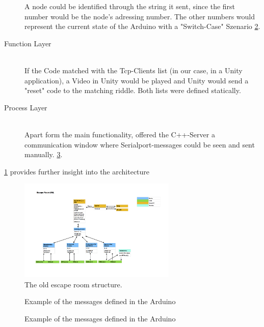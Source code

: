 \begin{description}
        A node could be identified through the string it sent, since the first number would be the node's adressing number. 
        The other numbers would represent the current state of the Arduino with a "Switch-Case" Szenario \ref{fig:switchCase}. 
	\item[Function Layer]\hfill \\
        If the Code matched with the Tcp-Clients list (in our case, in a Unity application), a Video in Unity would be played and Unity would send a "reset" code to the matching riddle. 
        Both lists were defined statically.
	\item[Process Layer]\hfill \\
	Apart form the main functionality, offered the C++-Server a communication window where Serialport-messages 
    could be seen and sent manually. \ref{fig:c++window}.

\end{description}
\ref{fig:oldEscapeUml} provides further insight into the architecture
\begin{figure}[th]
	\centering
	\includegraphics[width=75mm,scale=0.75]{Figures/oldEscapeUml}
	\decoRule
	\caption[UML]{The old escape room structure.}
	\label{fig:oldEscapeUml}
\end{figure}
\begin{figure}[th]
    \decoRule
    \caption[messages]{Example of the messages defined in the Arduino}
    \label{fig:switchCase}
\end{figure}
\begin{figure}[th]
    \decoRule
    \caption[messages]{Example of the messages defined in the Arduino}
    \label{fig:c++window}
\end{figure}

